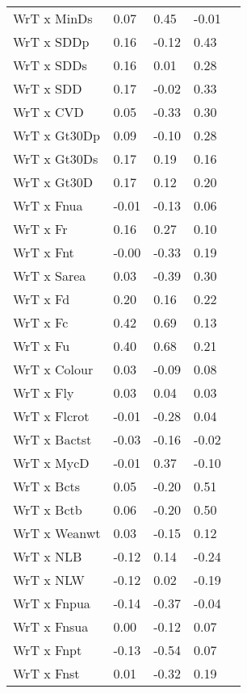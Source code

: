 \begin{table}[h]
\begin{tabular}{|p{1.2in}|p{0.8in}|p{0.8in}|p{0.8in}|p{0.8in}|}
 WrT x MinDs & 0.07 & 0.45 & -0.01  \\
 WrT x SDDp & 0.16 & -0.12 & 0.43 \\
 WrT x SDDs & 0.16 & 0.01 & 0.28 \\
 WrT x SDD & 0.17 & -0.02 & 0.33 \\
 WrT x CVD & 0.05 & -0.33 & 0.30 \\
 WrT x Gt30Dp & 0.09 & -0.10 & 0.28 \\
 WrT x Gt30Ds & 0.17 & 0.19 & 0.16 \\
 WrT x Gt30D & 0.17 & 0.12 & 0.20 \\
 WrT x Fnua & -0.01 & -0.13 & 0.06 \\
 WrT x Fr & 0.16 & 0.27 & 0.10 \\
 WrT x Fnt & -0.00 & -0.33 & 0.19 \\
 WrT x Sarea & 0.03 & -0.39 & 0.30 \\
 WrT x Fd & 0.20 & 0.16 & 0.22 \\
 WrT x Fc & 0.42 & 0.69 & 0.13 \\
 WrT x Fu & 0.40 & 0.68 & 0.21 \\
 WrT x Colour & 0.03 & -0.09 & 0.08 \\
 WrT x Fly & 0.03 & 0.04 & 0.03 \\
 WrT x Flcrot & -0.01 & -0.28 & 0.04  \\
 WrT x Bactst & -0.03 & -0.16 & -0.02 \\
 WrT x MycD & -0.01 & 0.37 & -0.10 \\
 WrT x Bcts & 0.05 & -0.20 & 0.51 \\
 WrT x Bctb & 0.06 & -0.20 & 0.50 \\
 WrT x Weanwt & 0.03 & -0.15 & 0.12 \\
 WrT x NLB & -0.12 & 0.14 & -0.24 \\
 WrT x NLW & -0.12 & 0.02 & -0.19 \\
 WrT x Fnpua & -0.14 & -0.37 & -0.04 \\
 WrT x Fnsua & 0.00 & -0.12 & 0.07 \\
 WrT x Fnpt & -0.13 & -0.54 & 0.07 \\
 WrT x Fnst & 0.01 & -0.32 & 0.19 \\ \hline
\end{tabular}
\end{table}

%
